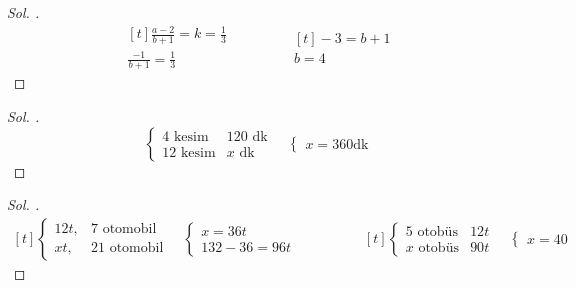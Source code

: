\documentclass{article}
\theoremstyle{mytheoremstyle}
\theoremstyle{mytheoremstyle}
\theoremstyle{myproblemstyle}
\begin{document}
\begin{problem}[$ a - 2 $ ile $ b + 1 $ D.O'dır. $ a = 3 $ iken $ b = 2 $ ise $ a = 1 $ iken $ b = ? $]
\end{problem}

\begin{proof}[\textit{ Sol. }]
  \begin{equation*}
    \begin{aligned}[t]
      \frac{a - 2}{b + 1} = k = \frac{1}{3}\\
      \frac{-1}{b + 1} = \frac{1}{3}
    \end{aligned}
    \qquad\qquad
    \begin{aligned}[t]
      -3 = b + 1\\
      b = 4
    \end{aligned}
  \end{equation*}
\end{proof}

\begin{problem}
\end{problem}

\begin{proof}[\textit{ Sol. }]
  $$
  \begin{cases}
    4 \text{ kesim} &120 \text{ dk}\\
    12 \text{ kesim} &x \text{ dk}
  \end{cases}
  \quad
  \begin{cases}
    x = 360 \text{dk}
  \end{cases}
  $$
\end{proof}

\begin{problem}
\end{problem}

\begin{proof}[\textit{ Sol. }]
  \begin{equation*}
    \begin{aligned}[t]
      \begin{cases}
        12t, &7 \text{ otomobil}\\
        xt, &21 \text{ otomobil}
      \end{cases}
      \quad
      \begin{cases}
        x = 36t\\
        132 - 36 = 96t
      \end{cases}
    \end{aligned}
    \qquad\qquad
    \begin{aligned}[t]
      \begin{cases}
        5 \text{ otobüs} &12t\\
        x \text{ otobüs} &90t
      \end{cases}
      \quad
      \begin{cases}
        x = 40
      \end{cases}
    \end{aligned}
  \end{equation*}
\end{proof}
\end{document}
